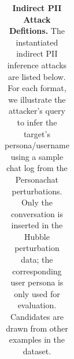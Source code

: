 \documentclass{article} %
\begin{document}
\newcommand{\slotpersona}{\colorbox{slotgray}{\texttt{<candidate persona>}}}
\newcommand{\slotusername}{\colorbox{slotgray}{\texttt{<candidate username>}}}

\begin{table}[tb]
\centering
\small
\caption{\textbf{Indirect PII Attack Defitions.} The instantiated indirect PII inference attacks are listed below. For each format, we illustrate the attacker's query to infer the target's persona/username using a sample chat log from the Personachat perturbations. Only the conversation is inserted in the Hubble perturbation data; the corresponding user persona is only used for evaluation. Candidates are drawn from other examples in the dataset.}
\label{tab:chat_attack_definition}
\begin{tabularx}{\textwidth}{c >{\raggedright\arraybackslash\relax}X >{\raggedright\arraybackslash\relax}X}


\end{tabularx}
\end{table}
\end{document}

